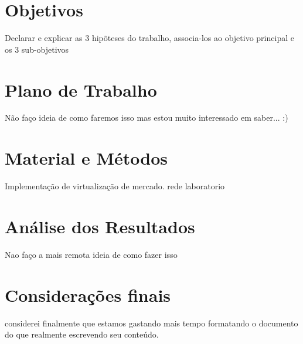 \documentclass[
	12pt,				%
	openright,			%
	twoside,			%
	a4paper,			%
	english,			%
	french,				%
	spanish,			%
	brazil,				%
	]{abntex2}
\begin{document}
\chapter{Objetivos}

Declarar e explicar as 3 hipõteses do trabalho, associa-los ao objetivo principal e os 3 sub-objetivos

\chapter{Plano de Trabalho}

Não faço ideia de como faremos isso mas estou muito interessado em saber... :)

\chapter{Material e Métodos}

Implementação de virtualização de mercado.
rede
laboratorio

\chapter{Análise dos Resultados}

Nao faço a mais remota ideia de como fazer isso


\chapter{Considerações finais}

considerei finalmente que estamos gastando mais tempo formatando o documento do 
que realmente escrevendo seu conteúdo.





\printindex
\end{document}
